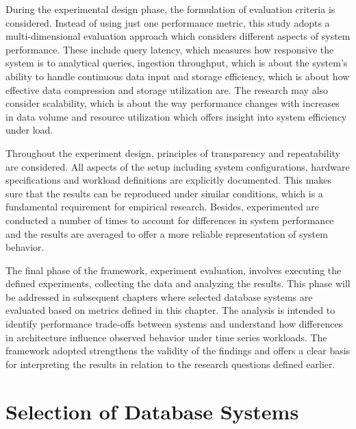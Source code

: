 During the experimental design phase, the formulation of evaluation criteria is considered. Instead of using just one performance metric, this study adopts a multi-dimensional evaluation approach which considers different aspects of system performance. These include query latency, which measures how responsive the system is to analytical queries, ingestion throughput, which is about the system’s ability to handle continuous data input and storage efficiency, which is about how effective data compression and storage utilization are. The research may also consider scalability, which is about the way performance changes with increases in data volume and resource utilization which offers insight into system efficiency under load. 


Throughout the experiment design, principles of transparency and repeatability are considered. All aspects of the setup including system configurations, hardware specifications and workload definitions are explicitly documented. This makes sure that the results can be reproduced under similar conditions, which is a fundamental requirement for empirical research. Besides, experimented are conducted a number of times to account for differences in system performance and the results are averaged to offer a more reliable representation of system behavior. 


The final phase of the \citet{Brown_1996} framework, experiment evaluation, involves executing the defined experiments, collecting the data and analyzing the results. This phase will be addressed in subsequent chapters where selected database systems are evaluated based on metrics defined in this chapter. The analysis is intended to identify performance trade-offs between systems and understand how differences in architecture influence observed behavior under time series workloads. The framework adopted strengthens the validity of the findings and offers a clear basis for interpreting the results in relation to the research questions defined earlier. 


\section{Selection of Database Systems}


